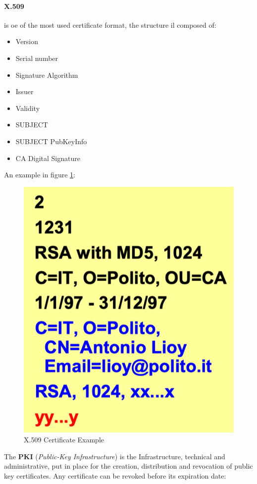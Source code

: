 \documentclass[12pt]{article}
\begin{document}
\paragraph{X.509} is oe of the most used certificate format, the structure il composed of:
\begin{itemize}
  \item Version
  \item Serial number
  \item Signature Algorithm
  \item Issuer
  \item Validity
  \item SUBJECT
  \item SUBJECT PubKeyInfo
  \item CA Digital Signature
\end{itemize}
An example in figure \ref{fig:x509}:
\begin{figure}[H]
   \centering
   \includegraphics[width=\linewidth]{images/x509.png}
   \caption{X.509 Certificate Example}
   \label{fig:x509}
\end{figure}
The \textbf{PKI} (\textit{Public-Key Infrastructure}) is the Infrastructure, technical and administrative, put in place for the creation, distribution and revocation of public key certificates. Any certificate can be revoked before its expiration date:
\end{document}
